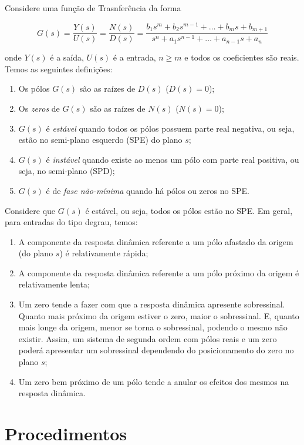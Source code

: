 \documentclass[
]{book}
\providecommand{\tightlist}{%
  \setlength{\itemsep}{0pt}\setlength{\parskip}{0pt}}
\begin{document}
Considere uma função de Trasnferência da forma

\[
G(s) = \frac{Y(s)}{U(s)} = \frac{N(s)}{D(s)} = \frac{b_1s^m +b_2s^{m-1} + \dots + b_ms + b_{m+1}}{s^n + a_1s^{n-1}+ \dots + a_{n-1}s + a_n}
\]

onde \(Y(s)\) é a saída, \(U(s)\) é a entrada, \(n \geq m\) e todos os coeficientes são reais. Temos as seguintes definições:

\begin{enumerate}
\def\labelenumi{\arabic{enumi}.}
\tightlist
\item
  Os pólos \(G(s)\) são as raízes de \(D(s)\) (\(D(s) = 0\));
\item
  Os \emph{zeros} de \(G(s)\) são as raízes de \(N(s)\) (\(N(s) = 0\));
\item
  \(G(s)\) é \emph{estável} quando todos os pólos possuem parte real negativa, ou seja, estão no semi-plano esquerdo (SPE) do plano \(s\);
\item
  \(G(s)\) é \emph{instável} quando existe ao menos um pólo com parte real positiva, ou seja, no semi-plano (SPD);
\item
  \(G(s)\) é de \emph{fase não-mínima} quando há pólos ou zeros no SPE.
\end{enumerate}

Considere que \(G(s)\) é estável, ou seja, todos os pólos estão no SPE. Em geral, para entradas do tipo degrau, temos:

\begin{enumerate}
\def\labelenumi{\arabic{enumi}.}
\tightlist
\item
  A componente da resposta dinâmica referente a um pólo afastado da origem (do plano \(s\)) é relativamente rápida;
\item
  A componente da resposta dinâmica referente a um pólo próximo da origem é relativamente lenta;
\item
  Um zero tende a fazer com que a resposta dinâmica apresente sobressinal. Quanto mais próximo da origem estiver o zero, maior o sobressinal. E, quanto mais longe da origem, menor se torna o sobressinal, podendo o mesmo não existir. Assim, um sistema de segunda ordem com pólos reais e um zero poderá apresentar um sobressinal dependendo do posicionamento do zero no plano \(s\);
\item
  Um zero bem próximo de um pólo tende a anular os efeitos dos mesmos na resposta dinâmica.
\end{enumerate}

\hypertarget{procedimentos}{%
\section{Procedimentos}\label{procedimentos}}
\end{document}
